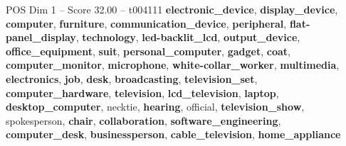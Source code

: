 \begin{textsample}{POS Dim 1 – Score 32.00 – t004111}  \label{ex:f1_pos_009}
\textbf{electronic\_device}, \textbf{display\_device}, \textbf{computer}, \textbf{furniture}, \textbf{communication\_device}, \textbf{peripheral}, \textbf{flat-panel\_display}, \textbf{technology}, \textbf{led-backlit\_lcd}, \textbf{output\_device}, \textbf{office\_equipment}, \textbf{suit}, \textbf{personal\_computer}, \textbf{gadget}, \textbf{coat}, \textbf{computer\_monitor}, \textbf{microphone}, \textbf{white-collar\_worker}, \textbf{multimedia}, \textbf{electronics}, \textbf{job}, \textbf{desk}, \textbf{broadcasting}, \textbf{television\_set}, \textbf{computer\_hardware}, \textbf{television}, \textbf{lcd\_television}, \textbf{laptop}, \textbf{desktop\_computer}, necktie, \textbf{hearing}, official, \textbf{television\_show}, spokesperson, \textbf{chair}, \textbf{collaboration}, \textbf{software\_engineering}, \textbf{computer\_desk}, \textbf{businessperson}, \textbf{cable\_television}, \textbf{home\_appliance}

\end{textsample}
